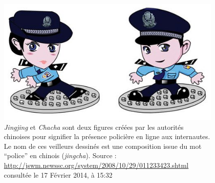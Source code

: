 \begin{figure}[htbp]
    \centering
    \includegraphics{figures/chap1/jingcha.jpg}
    \caption[Jingjing et Chacha, les policiers de l'Internet chinois]{\textit{Jingjing} et \textit{Chacha} sont deux figures créées par les autorités chinoises pour signifier la présence policière en ligne aux internautes. Le nom de ces veilleurs dessinés est une composition issue du mot “police” en chinois (\textit{jingcha}). Source : \url{http://jswm.newssc.org/system/2008/10/29/011233423.shtml} consultée le 17 Février 2014, à 15:32}
    \label{fig:jingcha}
\end{figure}

